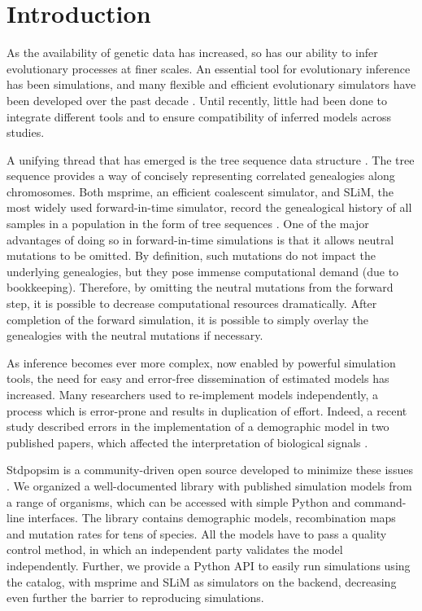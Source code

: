 \section{Introduction}

As the availability of genetic data has increased,
so has our ability to infer evolutionary processes at finer scales.
An essential tool for evolutionary inference has been simulations,
and many flexible and efficient evolutionary simulators have been developed over the past decade \citep{hudson_testing_1983, hudson_test_1987, carvajal-rodriguez_simulation_2008, ohta_simulation_1974, hoban_computer_2012, bulmer_effect_1976}.
Until recently, little had been done to integrate different tools and to ensure compatibility of inferred models across studies.

A unifying thread that has emerged is the tree sequence data structure \citep{kelleher_efficient_2016}.
The tree sequence provides a way of concisely representing correlated genealogies along chromosomes.
Both msprime, an efficient coalescent simulator, and SLiM, the most widely used forward-in-time simulator,
record the genealogical history of all samples in a population in the form of tree sequences \citep{kelleher_efficient_2018, haller_tree-sequence_2019, haller_slim_2019}.
One of the major advantages of doing so in forward-in-time simulations is that it allows neutral mutations to be omitted.
By definition, such mutations do not impact the underlying genealogies, but they pose immense computational demand (due to bookkeeping).
Therefore, by omitting the neutral mutations from the forward step, it is possible to decrease computational resources dramatically.
After completion of the forward simulation, it is possible to simply overlay the genealogies with the neutral mutations if necessary.

As inference becomes ever more complex, now enabled by powerful simulation tools,
the need for easy and error-free dissemination of estimated models has increased.
Many researchers used to re-implement models independently,
a process which is error-prone and results in duplication of effort.
Indeed, a recent study described errors in the implementation of a demographic model in two published papers,
which affected the interpretation of biological signals \citep{ragsdale_lessons_2020}.

Stdpopsim is a community-driven open source developed to minimize these issues \citep{adrion_community-maintained_2020, lauterbur_expanding_2023}.
We organized a well-documented library with published simulation models from a range of organisms,
which can be accessed with simple Python and command-line interfaces.
The library contains demographic models, recombination maps and mutation rates for tens of species.
All the models have to pass a quality control method, in which an independent party validates the model independently.
Further, we provide a Python API to easily run simulations using the catalog, with msprime and SLiM as simulators on the backend,
decreasing even further the barrier to reproducing simulations.

